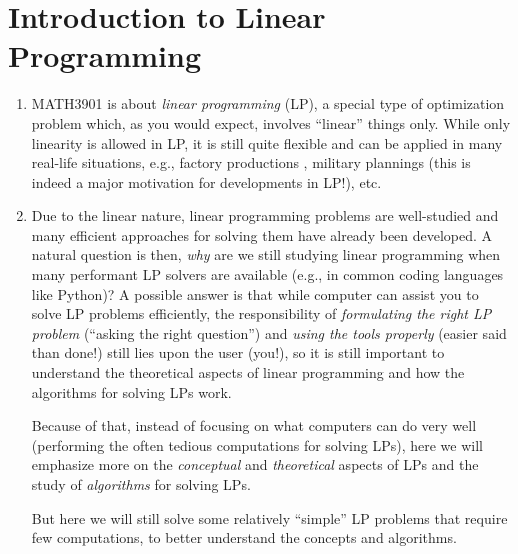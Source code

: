 \section{Introduction to Linear Programming}
\label{sect:intro-to-lp}
\begin{enumerate}
\item MATH3901 is about \emph{linear programming} (LP), a special type of
optimization problem which, as you would expect, involves ``linear'' things
only.  While only linearity is allowed in LP, it is still quite flexible and
can be applied in many real-life situations, e.g., factory productions
, military plannings  (this is indeed a major
motivation for developments in LP!), etc.

\item Due to the linear nature, linear programming problems are well-studied
and many efficient approaches for solving them have already been developed.  A
natural question is then, \emph{why} are we still studying linear programming
when many performant LP solvers are available (e.g., in common coding languages
like Python)? A possible answer is that while computer  can
assist you to solve LP problems efficiently, the responsibility of
\emph{formulating the right LP problem} (``asking the right question'') and
\emph{using the tools properly} (easier said than done!) still lies upon the
user (you!), so it is still important to understand the theoretical aspects of
linear programming and how the algorithms for solving LPs work.

Because of that, instead of focusing on what computers can do very well
(performing the often tedious computations for solving LPs), here we will
emphasize more on the \emph{conceptual} and \emph{theoretical} aspects of LPs
and the study of \emph{algorithms} for solving LPs. \begin{note} But here we
will still solve some relatively ``simple'' LP problems that require few
computations, to better understand the concepts and algorithms.
\end{note}
\end{enumerate}
